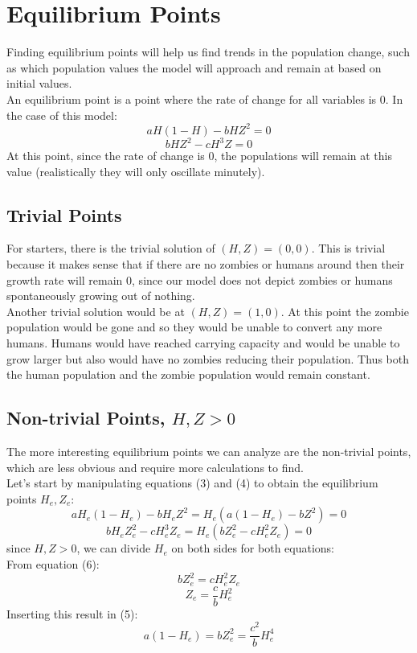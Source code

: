 \documentclass[11pt]{article}
\begin{document}
\section{Equilibrium Points}
Finding equilibrium points will help us find trends in the population change, such as which population values the model will approach and remain at based on initial values.\\
An equilibrium point is a point where the rate of change for all variables is $0$. In the case of this model:
\begin{equation}
aH(1 - H) - bHZ^2 = 0
\end{equation}
\begin{equation}
bHZ^2 - cH^3Z = 0
\end{equation}
At this point, since the rate of change is $0$, the populations will remain at this value (realistically they will only oscillate minutely).

\subsection{Trivial Points}
 For starters, there is the trivial solution of $(H, Z) = (0,0)$. This is trivial because it makes sense that if there are no zombies or humans around then their growth rate will remain 0, since our model does not depict zombies or humans spontaneously growing out of nothing.\\
Another trivial solution would be at $(H, Z) = (1, 0)$. At this point the zombie population would be gone and so they would be unable to convert any more humans. Humans would have reached carrying capacity and would be unable to grow larger but also would have no zombies reducing their population. Thus both the human population and the zombie population would remain constant.\\ 

\subsection{Non-trivial Points, $H,Z > 0$}
The more interesting equilibrium points we can analyze are the non-trivial points, which are less obvious and require more calculations to find.\\
Let's start by manipulating equations (3) and (4) to obtain the equilibrium points $H_e, Z_e$:
\begin{equation}
aH_e(1 - H_e) - bH_eZ^2 = H_e(a(1 - H_e) - bZ^2) = 0
\end{equation}
\begin{equation}
bH_eZ_e^2 - cH_e^3Z_e = H_e(bZ_e^2 - cH_e^2Z_e) = 0
\end{equation}
since $H,Z > 0$, we can divide $H_e$ on both sides for both equations:\\
From equation (6):
\[bZ_e^2 = cH_e^2Z_e \]
\begin{equation}
Z_e = \frac{c}{b} H_e^2 
\end{equation}
Inserting this result in (5):
\begin{equation}
a(1 - H_e) = bZ_e^2 = \frac{c^2}{b}H_e^4
\end{equation}
\end{document}
